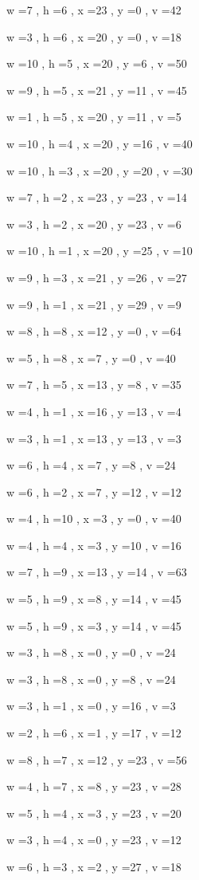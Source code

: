 \documentclass[11pt]{article}
\begin{document}
w =7 , h =6 , x =23 , y =0 , v =42
\par
w =3 , h =6 , x =20 , y =0 , v =18
\par
w =10 , h =5 , x =20 , y =6 , v =50
\par
w =9 , h =5 , x =21 , y =11 , v =45
\par
w =1 , h =5 , x =20 , y =11 , v =5
\par
w =10 , h =4 , x =20 , y =16 , v =40
\par
w =10 , h =3 , x =20 , y =20 , v =30
\par
w =7 , h =2 , x =23 , y =23 , v =14
\par
w =3 , h =2 , x =20 , y =23 , v =6
\par
w =10 , h =1 , x =20 , y =25 , v =10
\par
w =9 , h =3 , x =21 , y =26 , v =27
\par
w =9 , h =1 , x =21 , y =29 , v =9
\par
w =8 , h =8 , x =12 , y =0 , v =64
\par
w =5 , h =8 , x =7 , y =0 , v =40
\par
w =7 , h =5 , x =13 , y =8 , v =35
\par
w =4 , h =1 , x =16 , y =13 , v =4
\par
w =3 , h =1 , x =13 , y =13 , v =3
\par
w =6 , h =4 , x =7 , y =8 , v =24
\par
w =6 , h =2 , x =7 , y =12 , v =12
\par
w =4 , h =10 , x =3 , y =0 , v =40
\par
w =4 , h =4 , x =3 , y =10 , v =16
\par
w =7 , h =9 , x =13 , y =14 , v =63
\par
w =5 , h =9 , x =8 , y =14 , v =45
\par
w =5 , h =9 , x =3 , y =14 , v =45
\par
w =3 , h =8 , x =0 , y =0 , v =24
\par
w =3 , h =8 , x =0 , y =8 , v =24
\par
w =3 , h =1 , x =0 , y =16 , v =3
\par
w =2 , h =6 , x =1 , y =17 , v =12
\par
w =8 , h =7 , x =12 , y =23 , v =56
\par
w =4 , h =7 , x =8 , y =23 , v =28
\par
w =5 , h =4 , x =3 , y =23 , v =20
\par
w =3 , h =4 , x =0 , y =23 , v =12
\par
w =6 , h =3 , x =2 , y =27 , v =18
\par
\newpage
\end{document}
